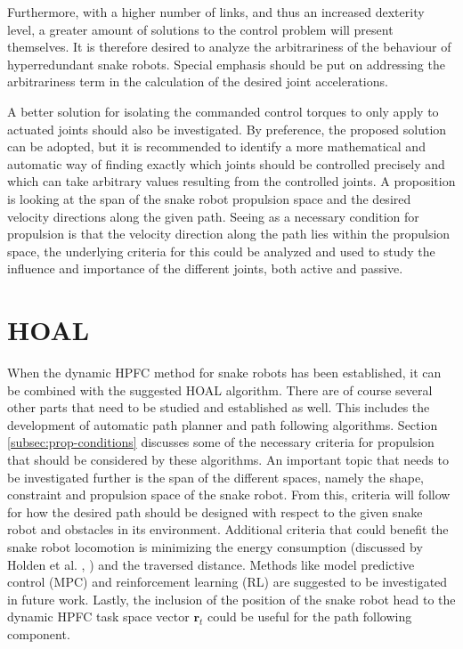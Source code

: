 Furthermore, with a higher number of links, and thus an increased dexterity level, a greater amount of solutions to the control problem will present themselves. It is therefore desired to analyze the arbitrariness of the behaviour of hyperredundant snake robots. Special emphasis should be put on addressing the arbitrariness term in the calculation of the desired joint accelerations.

A better solution for isolating the commanded control torques to only apply to actuated joints should also be investigated. By preference, the proposed solution can be adopted, but it is recommended to identify a more mathematical and automatic way of finding exactly which joints should be controlled precisely and which can take arbitrary values resulting from the controlled joints. A proposition is looking at the span of the snake robot propulsion space and the desired velocity directions along the given path. Seeing as a necessary condition for propulsion is that the velocity direction along the path lies within the propulsion space, the underlying criteria for this could be analyzed and used to study the influence and importance of the different joints, both active and passive.


\section{HOAL}

When the dynamic HPFC method for snake robots has been established, it can be combined with the suggested HOAL algorithm. There are of course several other parts that need to be studied and established as well. This includes the development of automatic path planner and path following algorithms. Section \ref{subsec:prop-conditions} discusses some of the necessary criteria for propulsion that should be considered by these algorithms. An important topic that needs to be investigated further is the span of the different spaces, namely the shape, constraint and propulsion space of the snake robot. From this, criteria will follow for how the desired path should be designed with respect to the given snake robot and obstacles in its environment. Additional criteria that could benefit the snake robot locomotion is minimizing the energy consumption (discussed by Holden et al. \cite{holden2013optimal}, \cite{holden2014optimal}) and the traversed distance. Methods like model predictive control (MPC) and reinforcement learning (RL) are suggested to be investigated in future work. Lastly, the inclusion of the position of the snake robot head to the dynamic HPFC task space vector $\mathbf{r}_t$ could be useful for the path following component.

